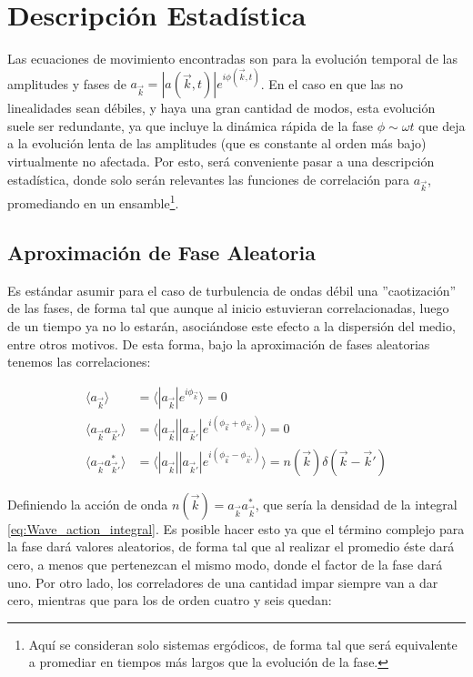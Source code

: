 \section{Descripción Estadística} %
\label{sec:descripción_estadística} 
Las ecuaciones de movimiento encontradas son para la evolución temporal de las amplitudes y fases de $a_{\vec k} = |a(\vec k, t)|e^{i\phi(\vec k, t)}$. En el caso en que las no linealidades sean débiles, y haya una gran cantidad de modos, esta evolución suele ser redundante, ya que incluye la dinámica rápida de la fase $\phi\sim\omega t$ que deja a la evolución lenta de las amplitudes (que es constante al orden más bajo) virtualmente no afectada. Por esto, será conveniente pasar a una descripción estadística, donde solo serán relevantes las funciones de correlación para $a_{\vec k}$, promediando en un ensamble\footnote{Aquí se consideran solo sistemas ergódicos, de forma tal que será equivalente a promediar en tiempos más largos que la evolución de la fase.}. 


\subsection{Aproximación de Fase Aleatoria} %
Es estándar asumir para el caso de turbulencia de ondas débil una ''caotización'' de las fases, de forma tal que aunque al inicio estuvieran correlacionadas, luego de un tiempo ya no lo estarán,  asociándose este efecto a la dispersión del medio, entre otros motivos. De esta forma, bajo la aproximación de fases aleatorias tenemos las correlaciones: %

\begin{equation}
	\begin{split}
		\langle a_{\vec k}\rangle &= \langle |a_{\vec k}|e^{i\phi_{\vec k}}	 \rangle = 0 \\
		\langle a_{\vec k} a_{\vec k'} \rangle &= \langle |a_{\vec k}||a_{\vec k'}| e^{i(\phi_{\vec k}+\phi_{\vec k'})} \rangle = 0 \\
		\langle a_{\vec k} a^*_{\vec k'} \rangle  &= \langle |a_{\vec k}||a_{\vec k'}| e^{i(\phi_{\vec k}-\phi_{\vec k'})} \rangle = n(\vec k) \delta(\vec k - \vec k')
	\end{split}
\end{equation} 

Definiendo la acción de onda $n(\vec k) = a_{\vec k}a^*_{\vec k}$, que sería la densidad  de la integral \eqref{eq:Wave_action_integral}. Es posible hacer esto ya que el término complejo para la fase dará valores aleatorios, de forma tal que al realizar el promedio éste dará cero, a menos que pertenezcan el mismo modo, donde el factor de la fase dará uno. Por otro lado, los correladores de una cantidad impar siempre van a dar cero, mientras que para los de orden cuatro y seis quedan: %




